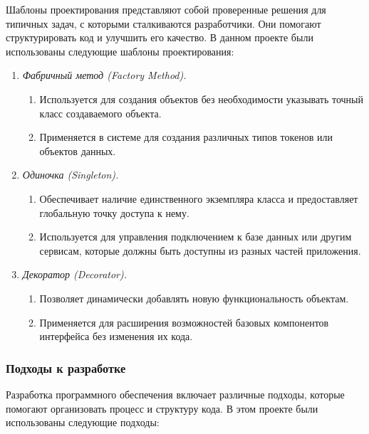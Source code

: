 Шаблоны проектирования представляют собой проверенные решения для типичных задач, с которыми сталкиваются разработчики. Они помогают структурировать код и улучшить его качество. В данном проекте были использованы следующие шаблоны проектирования:

\begin{enumerate}
    \item \textit{Фабричный метод (Factory Method).}
    \begin{enumerate}
        \item Используется для создания объектов без необходимости указывать точный класс создаваемого объекта.
        \item Применяется в системе для создания различных типов токенов или объектов данных.
    \end{enumerate}
    \item \textit{Одиночка (Singleton).}
    \begin{enumerate}
        \item Обеспечивает наличие единственного экземпляра класса и предоставляет глобальную точку доступа к нему.
        \item Используется для управления подключением к базе данных или другим сервисам, которые должны быть доступны из разных частей приложения.
    \end{enumerate}
    \item \textit{Декоратор (Decorator).}
    \begin{enumerate}
        \item Позволяет динамически добавлять новую функциональность объектам.
        \item Применяется для расширения возможностей базовых компонентов интерфейса без изменения их кода.
    \end{enumerate}
\end{enumerate}

\subsubsection{Подходы к разработке}

Разработка программного обеспечения включает различные подходы, которые помогают организовать процесс и структуру кода. В этом проекте были использованы следующие подходы:

